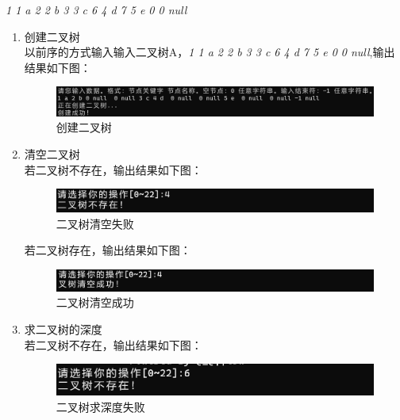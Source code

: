 \documentclass[supercite]{Experimental_Report}
\theoremstyle{definition}
\begin{document}
\emph{1 1 a  2 2 b   3 3 c  6 4 d  7 5 e  0 0 null}
\begin{enumerate}
	\item 创建二叉树\\
	以前序的方式输入输入二叉树A，\emph{1 1 a  2 2 b   3 3 c  6 4 d  7 5 e  0 0 null},输出结果如下图：
\begin{figure}[H]
	\centering
	\includegraphics[width=1\linewidth]{images/创建二叉树.png}
	\caption{创建二叉树}
	\label{fig2-8}
\end{figure}
	\item 清空二叉树\\
	若二叉树不存在，输出结果如下图：
	\begin{figure}[H]
		\centering
		\includegraphics[width=1\linewidth]{images/二叉树清空失败.png}
		\caption{二叉树清空失败}
		\label{fig2-9}
	\end{figure}

	若二叉树存在，输出结果如下图：
	\begin{figure}[H]
		\centering
		\includegraphics[width=1\linewidth]{images/二叉树清空成功.png}
		\caption{二叉树清空成功}
		\label{fig2-10}
	\end{figure}
	\item 求二叉树的深度\\
	若二叉树不存在，输出结果如下图：
	\begin{figure}[H]
		\centering
		\includegraphics[width=1\linewidth]{images/求深度失败.png}
		\caption{二叉树求深度失败}
		\label{fig2-11}
	\end{figure}


\end{enumerate}
\end{document}
